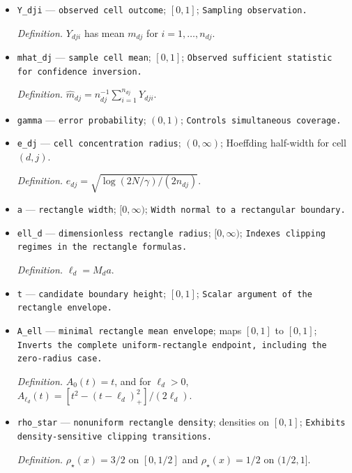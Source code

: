 \documentclass{article}
\begin{document}
\begin{itemize}
  \par\smallskip\noindent\emph{Definition.} \(n_{dj}\) is fixed conditional on the sampling design.
  \item \texttt{Y\_\allowbreak{}dji} --- \texttt{observed cell outcome}; \([0,1]\); \texttt{Sampling observation.}
  \par\smallskip\noindent\emph{Definition.} \(Y_{dji}\) has mean \(m_{dj}\) for \(i=1,\ldots,n_{dj}\).
  \item \texttt{mhat\_\allowbreak{}dj} --- \texttt{sample cell mean}; \([0,1]\); \texttt{Observed sufficient statistic for confidence inversion.}
  \par\smallskip\noindent\emph{Definition.} \(\widehat m_{dj}=n_{dj}^{-1}\sum_{i=1}^{n_{dj}}Y_{dji}\).
  \item \texttt{gamma} --- \texttt{error probability}; \((0,1)\); \texttt{Controls simultaneous coverage.}
  \item \texttt{e\_\allowbreak{}dj} --- \texttt{cell concentration radius}; \((0,\infty)\); Hoeffding half-width for cell \((d,j)\).
  \par\smallskip\noindent\emph{Definition.} \(e_{dj}=\sqrt{\log(2N/\gamma)/(2n_{dj})}\).
  \item \texttt{a} --- \texttt{rectangle width}; \([0,\infty)\); \texttt{Width normal to a rectangular boundary.}
  \item \texttt{ell\_\allowbreak{}d} --- \texttt{dimensionless rectangle radius}; \([0,\infty)\); \texttt{Indexes clipping regimes in the rectangle formulas.}
  \par\smallskip\noindent\emph{Definition.} \(\ell_d=M_da\).
  \item \texttt{t} --- \texttt{candidate boundary height}; \([0,1]\); \texttt{Scalar argument of the rectangle envelope.}
  \item \texttt{A\_\allowbreak{}ell} --- \texttt{minimal rectangle mean envelope}; maps \([0,1]\) to \([0,1]\); \texttt{Inverts the complete uniform-\allowbreak{}rectangle endpoint,\allowbreak{} including the zero-\allowbreak{}radius case.}
  \par\smallskip\noindent\emph{Definition.} \(A_0(t)=t\), and for \(\ell_d>0\), \(A_{\ell_d}(t)=[t^2-(t-\ell_d)_+^2]/(2\ell_d)\).
  \item \texttt{rho\_\allowbreak{}star} --- \texttt{nonuniform rectangle density}; densities on \([0,1]\); \texttt{Exhibits density-\allowbreak{}sensitive clipping transitions.}
  \par\smallskip\noindent\emph{Definition.} \(\rho_\star(x)=3/2\) on \([0,1/2]\) and \(\rho_\star(x)=1/2\) on \((1/2,1]\).

\end{itemize}
\end{document}
